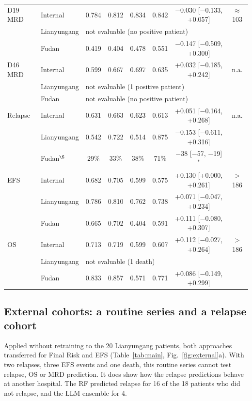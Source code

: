 \documentclass[pdflatex,sn-nature]{sn-jnl}
\begin{document}
\begin{table}[t]
\begin{tabular}{@{}llcccccc@{}}
\addlinespace[2pt]
D19 MRD & Internal & 0.784 & 0.812 & 0.834 & 0.842 & $-$0.030 [$-$0.133, +0.057] & $\approx$103 \\
 & Lianyungang & \multicolumn{5}{l}{not evaluable (no positive patient)} & \\
 & Fudan & 0.419 & 0.404 & 0.478 & 0.551 & $-$0.147 [$-$0.509, +0.300] & \\
\addlinespace[2pt]
D46 MRD & Internal & 0.599 & 0.667 & 0.697 & 0.635 & +0.032 [$-$0.185, +0.242] & n.a. \\
 & Lianyungang & \multicolumn{5}{l}{not evaluable (1 positive patient)} & \\
 & Fudan & \multicolumn{5}{l}{not evaluable (no positive patient)} & \\
\addlinespace[2pt]
Relapse & Internal & 0.631 & 0.663 & 0.623 & 0.613 & +0.051 [$-$0.164, +0.268] & n.a. \\
 & Lianyungang & 0.542 & 0.722 & 0.514 & 0.875 & $-$0.153 [$-$0.611, +0.316] & \\
 & Fudan$^{\S}$ & 29\% & 33\% & 38\% & 71\% & $-$38 [$-$57, $-$19]$^{*}$ & \\
\addlinespace[2pt]
EFS & Internal & 0.682 & 0.705 & 0.599 & 0.575 & +0.130 [+0.000, +0.261] & $>$186 \\
 & Lianyungang & 0.786 & 0.810 & 0.762 & 0.738 & +0.071 [$-$0.047, +0.234] & \\
 & Fudan & 0.665 & 0.702 & 0.404 & 0.591 & +0.111 [$-$0.080, +0.307] & \\
\addlinespace[2pt]
OS & Internal & 0.713 & 0.719 & 0.599 & 0.607 & +0.112 [$-$0.027, +0.264] & $>$186 \\
 & Lianyungang & \multicolumn{5}{l}{not evaluable (1 death)} & \\
 & Fudan & 0.833 & 0.857 & 0.571 & 0.771 & +0.086 [$-$0.149, +0.299] & \\
\bottomrule
\end{tabular}
\end{table}

\subsection{External cohorts: a routine series and a relapse cohort}
\label{sec:external}

Applied without retraining to the 20 Lianyungang patients, both
approaches transferred for Final Risk and EFS (Table~\ref{tab:main},
Fig.~\ref{fig:external}a).
With two relapses, three EFS events and one death, this routine series
cannot test relapse, OS or MRD prediction.
It does show how the relapse predictions behave at another hospital.
The RF predicted relapse for 16 of the 18 patients who did not
relapse, and the LLM ensemble for 4.
\end{document}
